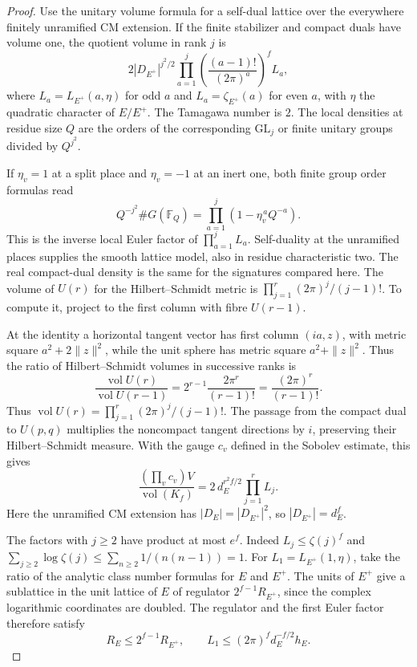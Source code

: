 \begin{proof}
Use the unitary volume formula for a self-dual lattice over the
everywhere finitely unramified CM extension. If the finite stabilizer
and compact duals have volume one, the quotient volume in rank \(j\) is
\begin{equation}\label{eq:row-self-dual-mass}
  2 |D_{E^+}|^{j^2/2}
  \prod_{a=1}^j \left(\frac{(a-1)!}{(2\pi)^a}\right)^f L_a ,
\end{equation}
where \(L_a=L_{E^+}(a,\eta)\) for odd \(a\) and
\(L_a=\zeta_{E^+}(a)\) for even \(a\), with \(\eta\) the quadratic
character of \(E/E^+\). The Tamagawa number is \(2\). The local
densities at residue size \(Q\) are the orders of the corresponding
\(\mathrm{GL}_j\) or finite unitary groups divided by \(Q^{j^2}\).

If \(\eta_v=1\) at a split place and \(\eta_v=-1\) at an inert
one, both finite group order formulas read
\[
  Q^{-j^2}\#G(\mathbb F_Q)
        =\prod_{a=1}^j(1-\eta_v^{\,a}Q^{-a}).
\]
This is the inverse local Euler factor of \(\prod_{a=1}^j L_a\).
Self-duality at the unramified places supplies the smooth lattice
model, also in residue characteristic two. The real compact-dual
density is the same for the signatures compared here.
\cite{gan-yu-row-count,terakado-yu-row-count}
The volume of \(U(r)\) for the Hilbert--Schmidt metric is
\(\prod_{j=1}^r(2\pi)^j/(j-1)!\). To compute it, project to
the first column with fibre \(U(r-1)\).

At the identity a
horizontal tangent vector has first column \((ia,z)\), with
metric square \(a^2+2\|z\|^2\), while the unit sphere has
metric square \(a^2+\|z\|^2\). Thus the ratio of Hilbert--Schmidt volumes in successive ranks is
\[
 \frac{\operatorname{vol}U(r)}{\operatorname{vol}U(r-1)}
   =2^{r-1}\frac{2\pi^r}{(r-1)!}=\frac{(2\pi)^r}{(r-1)!}.
\]
Thus \(\operatorname{vol}U(r)=\prod_{j=1}^r(2\pi)^j/(j-1)!\). The passage from the compact dual
to \(U(p,q)\) multiplies the noncompact tangent directions by
\(i\), preserving their Hilbert--Schmidt measure. With the
gauge \(c_v\) defined in the Sobolev estimate, this gives
\[
  \frac{(\prod_v c_v)V}{\operatorname{vol}(K_f)}
       =2\,d_E^{r^2f/2}\prod_{j=1}^r L_j .
\]
Here the unramified CM extension has
\(|D_E|=|D_{E^+}|^2\), so \(|D_{E^+}|=d_E^f\).

The factors with \(j\ge2\) have product at most \(e^f\).
Indeed \(L_j\le\zeta(j)^f\) and
\(\sum_{j\ge2}\log\zeta(j)\le\sum_{n\ge2}1/(n(n-1))=1\).
For \(L_1=L_{E^+}(1,\eta)\), take the ratio of the
analytic class number formulas for \(E\) and \(E^+\).
The units of \(E^+\) give a sublattice in the unit lattice of
\(E\) of regulator \(2^{f-1}R_{E^+}\), since the complex
logarithmic coordinates are doubled. The regulator and the first Euler factor therefore satisfy
\[
 R_E\le2^{f-1}R_{E^+},\qquad
 L_1\le(2\pi)^f d_E^{-f/2}h_E .
\]


\end{proof}
